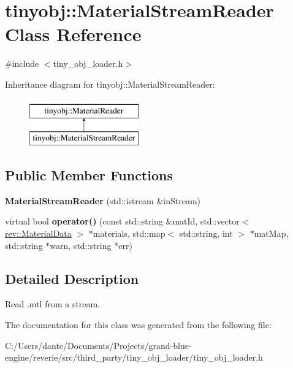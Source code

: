 \hypertarget{classtinyobj_1_1_material_stream_reader}{}\section{tinyobj\+::Material\+Stream\+Reader Class Reference}
\label{classtinyobj_1_1_material_stream_reader}


{\ttfamily \#include $<$tiny\+\_\+obj\+\_\+loader.\+h$>$}

Inheritance diagram for tinyobj\+::Material\+Stream\+Reader\+:\begin{figure}[H]
\begin{center}
\leavevmode
\includegraphics[height=2.000000cm]{classtinyobj_1_1_material_stream_reader}
\end{center}
\end{figure}
\subsection*{Public Member Functions}
\begin{DoxyCompactItemize}
\item 
\mbox{\label{classtinyobj_1_1_material_stream_reader_a6a6b7167e62d239cb3b002b6aa183773}} 
{\bfseries Material\+Stream\+Reader} (std\+::istream \&in\+Stream)
\item 
\mbox{\label{classtinyobj_1_1_material_stream_reader_a2a65a044bdda9eaf7c613638bd85d14a}} 
virtual bool {\bfseries operator()} (const std\+::string \&mat\+Id, std\+::vector$<$ \mbox{\hyperlink{structrev_1_1_material_data}{rev\+::\+Material\+Data}} $>$ $\ast$materials, std\+::map$<$ std\+::string, int $>$ $\ast$mat\+Map, std\+::string $\ast$warn, std\+::string $\ast$err)
\end{DoxyCompactItemize}


\subsection{Detailed Description}
Read .mtl from a stream. 

The documentation for this class was generated from the following file\+:\begin{DoxyCompactItemize}
\item 
C\+:/\+Users/dante/\+Documents/\+Projects/grand-\/blue-\/engine/reverie/src/third\+\_\+party/tiny\+\_\+obj\+\_\+loader/tiny\+\_\+obj\+\_\+loader.\+h\end{DoxyCompactItemize}
